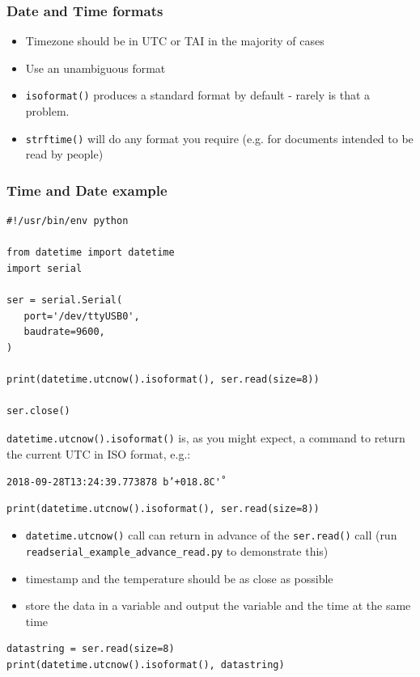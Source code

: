 \documentclass[aspectratio=1610,9pt]{beamer} %
\begin{document}
\begin{frame}[fragile]
\frametitle{Date and Time formats}

\begin{itemize}
\itemsep1pt\parskip0pt
\item
  Timezone should be in UTC or TAI in the majority of cases
\item
  Use an unambiguous format
\item
  \texttt{isoformat()} produces a standard format by default - rarely is
  that a problem.
\item
  \texttt{strftime()} will do any format you require (e.g. for documents
  intended to be read by people)
\end{itemize}

\end{frame}
\begin{frame}[fragile]
\frametitle{Time and Date example}

\begin{verbatim}
#!/usr/bin/env python

from datetime import datetime
import serial

ser = serial.Serial(
   port='/dev/ttyUSB0',
   baudrate=9600,
)

print(datetime.utcnow().isoformat(), ser.read(size=8))

ser.close()
\end{verbatim}
\end{frame}
\begin{frame}[fragile]

\texttt{datetime.utcnow().isoformat()} is, as you might expect, a
command to return the current UTC in ISO format, e.g.:

\texttt{2018-09-28T13:24:39.773878 b'+018.8C\r'}

\begin{verbatim}
print(datetime.utcnow().isoformat(), ser.read(size=8))
\end{verbatim}

\begin{itemize}
\itemsep1pt\parskip0pt
\item
  \texttt{datetime.utcnow()} call can return in advance of the
  \texttt{ser.read()} call (run \texttt{readserial\_example\_advance\_read.py} to demonstrate this) 
\item
  timestamp and the temperature should be as close as possible
\item
  store the data in a variable and output the variable and the time at
  the same time
\end{itemize}

\begin{verbatim}
datastring = ser.read(size=8)
print(datetime.utcnow().isoformat(), datastring)
\end{verbatim}

\end{frame}
\end{document}
